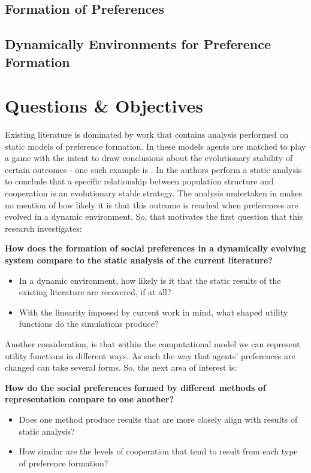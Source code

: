 \documentclass[11pt]{book}
\newcommand*{\np}{\par\noindent\newline}
\begin{document}
\subsection{Formation of Preferences}

\subsection{Dynamically Environments for Preference Formation}


\section{Questions \& Objectives}\label{questions}
Existing literature is dominated by work that contains analysis performed on static models of preference formation.
In these models agents are matched to play a game with the intent to draw conclusions about the evolutionary stability of certain outcomes - one such example is \citet{alger_generalization_2012}. 
In \citet{alger_generalization_2012} the authors perform a static analysis to conclude that a specific relationship between population structure and cooperation is an evolutionary stable strategy.
The analysis undertaken in \citet{alger_generalization_2012} makes no mention of how likely it is that this outcome is reached when preferences are evolved in a dynamic environment.
So, that motivates the first question that this research investigates:
\np\textbf{How does the formation of social preferences in a dynamically evolving system compare to the static analysis of the current literature?}
\begin{itemize}
\item In a dynamic environment, how likely is it that the static results of the existing literature are recovered, if at all? 
\item With the linearity imposed by current work in mind, what shaped utility functions do the simulations produce?
\end{itemize}
Another consideration, is that within the computational model we can represent utility functions in different ways.
As such the way that agents' preferences are changed can take several forms.
So, the next area of interest is:
\np\textbf{How do the social preferences formed by different methods of representation compare to one another?}
\begin{itemize}
\item Does one method produce results that are more closely align with results of static analysis?	
\item How similar are the levels of cooperation that tend to result from each type of preference formation?
\end{itemize}
\end{document}

